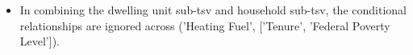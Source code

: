 \begin{itemize}
\begin{itemize}
  \item Federal Poverty Level coarsened every 100 percent
  \item Federal Poverty Level coarsened every 200 percent
  \item Census Division RECS with AK/HI separate coarsened to Census Division RECS
  \item Census Division RECS to Census Region
  \item Census Region to National
  \end{itemize}
\item In combining the dwelling unit sub-tsv and household sub-tsv, the conditional relationships are ignored across ('Heating Fuel', ['Tenure', 'Federal Poverty Level']).
\end{itemize}
